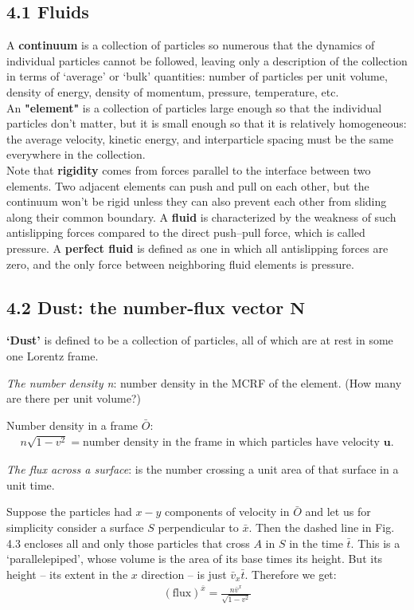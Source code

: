 \documentclass[11pt,letterpaper]{book}
\begin{document}
    \subsection{4.1 Fluids}
        A \textbf{continuum} is a collection of particles so numerous that the dynamics of individual particles cannot be followed, leaving only a description of the collection in terms of ‘average’ or ‘bulk’ quantities: number of particles per unit volume, density of energy, density of momentum, pressure, temperature, etc.\\
        An \textbf{"element"} is a collection of particles large enough so that the individual particles don’t matter, but it is small enough so that it is relatively homogeneous: the average velocity, kinetic energy, and interparticle spacing must be the same everywhere in the collection.\\
        Note that \textbf{rigidity} comes from forces parallel to the interface between two elements. Two adjacent elements can push and pull on each other, but the continuum won’t be rigid unless they can also prevent each other from sliding along their common boundary. A \textbf{fluid} is characterized by the weakness of such antislipping forces compared to the direct push–pull force, which is called pressure. A \textbf{perfect fluid} is defined as one in which all antislipping forces are zero, and the only force between neighboring fluid elements is pressure.

    \subsection{4.2 Dust: the number-flux vector $\mathbf{N}$}
    
    \textbf{‘Dust’} is defined to be a collection of particles, all of which are at rest in some one Lorentz frame.

    \textit{The number density n}: number density in the MCRF of the element. (How many are there per unit volume?)
    
    Number density in a frame \(\bar{O}\):
    \begin{align}
    n \sqrt{1 - v^2} = \text{number density in the frame in which particles have velocity } \mathbf{u}.
    \tag{4.2}
    \end{align}

    \textit{The flux across a surface}: is the number crossing a unit area of that surface in a unit time. 

    Suppose the particles had $x-y$ components of velocity in \(\bar{O}\) and let us for simplicity consider a surface $S$ perpendicular to $\bar{x}$. Then the dashed line in Fig. 4.3 encloses all and only those particles that cross \(A\) in \(S\) in the time \(\bar{t}\). This is a ‘parallelepiped’, whose volume is the area of its base times its height. But its height – its extent in the \(x\) direction – is just \(\bar{v}_x \bar{t}\). Therefore we get:
    \begin{align}
    (\text{flux})^{\bar{x}} = \frac{n \bar{v}^x }{\sqrt{1 - v^2}}
    \tag{4.3}
    \end{align}
\end{document}
